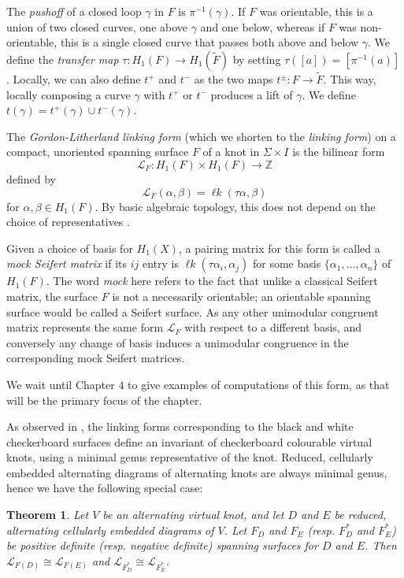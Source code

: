 \documentclass[12pt]{report}
\newcommand{\Z}{\mathbb{Z}}
\newcommand{\lk}{\operatorname{\ell\textit{k}}}
\newtheorem*{theorem}{Theorem}
\theoremstyle{upright}
\begin{document}
The \textit{pushoff} of a closed loop $\gamma$ in $F$ is $\pi^{-1}(\gamma)$. If $F$ was orientable, this is a union of two closed curves, one above $\gamma$ and one below, whereas if $F$ was non-orientable, this is a single closed curve that passes both above and below $\gamma$. We define the \textit{transfer map} $\tau: H_{1}(F) \longrightarrow H_{1}(\widetilde{F})$ by setting $\tau([a]) = [\pi^{-1}(a)]$. Locally, we can also define $t^{+}$ and $t^{-}$ as the two maps $t^{\pm}: F \longrightarrow \widetilde{F}$. This way, locally composing a curve $\gamma$ with $t^{+}$ or $t^{-}$ produces a lift of $\gamma$. We define $t(\gamma) = t^{+}(\gamma) \cup t^{-}(\gamma)$.


The \textit{Gordon-Litherland linking form} (which we shorten to the \textit{linking form}) on a compact, unoriented spanning surface $F$ of a knot in $\Sigma \times I$ is the bilinear form
\[\mathcal{L}_{F}: H_{1}(F) \times H_{1}(F) \longrightarrow \Z\]
defined by
\[\mathcal{L}_{F}(\alpha, \beta) = \lk(\tau\alpha, \beta)\]
for $\alpha, \beta \in H_{1}(F)$. By basic algebraic topology, this does not depend on the choice of representatives \cite[Chapter 2]{alternating-links-thickened-surfaces}. 

Given a choice of basis for $H_{1}(X)$, a pairing matrix for this form is called a \textit{mock Seifert matrix} if its $ij$ entry is $\lk(\tau \alpha_{i}, \alpha_{j})$ for some basis $\{\alpha_{1}, \dots, \alpha_{n}\}$ of $H_{1}(F)$. The word \textit{mock} here refers to the fact that unlike a classical Seifert matrix, the surface $F$ is not a necessarily orientable; an orientable spanning surface would be called a Seifert surface. As any other unimodular congruent matrix represents the same form $\mathcal{L}_{F}$ with respect to a different basis, and conversely any change of basis induces a unimodular congruence in the corresponding mock Seifert matrices.

We wait until Chapter $4$ to give examples of computations of this form, as that will be the primary focus of the chapter.

As observed in \cite[Section 3]{gordon-litherland-pairing-thickened-surfaces}, the linking forms corresponding to the black and white checkerboard surfaces define an invariant of checkerboard colourable virtual knots, using a minimal genus representative of the knot. Reduced, cellularly embedded alternating diagrams of alternating knots are always minimal genus, hence we have the following special case:

\begin{theorem}
Let $V$ be an alternating virtual knot, and let $D$ and $E$ be reduced, alternating cellularly embedded diagrams of $V$. Let $F_{D}$ and $F_{E}$ (resp. $F^{*}_{D}$ and $F^{*}_{E}$) be positive definite (resp. negative definite) spanning surfaces for $D$ and $E$. Then $\mathcal{L}_{F(D)} \cong \mathcal{L}_{F(E)}$ and $\mathcal{L}_{F_{D}^{*}} \cong \mathcal{L}_{F_{E}^{*}}$.
\end{theorem}
\end{document}
